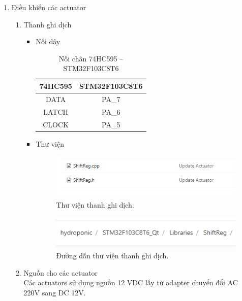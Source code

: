 \documentclass[a4paper,12pt,oneside]{article}
\begin{document}
\begin{enumerate}
\begin{itemize}
	\end{itemize}
	
	\item Điều khiển các actuator
		\begin{enumerate}
			\item Thanh ghi dịch
			\begin{itemize}
			\item Nối dây
				\begin{table}[!htp]
    			\centering
				\begin{tabular}{|c|c|}
				\hline 
				74HC595 & STM32F103C8T6 \\ 
				\hline 
				DATA & PA\_7 \\ 
				\hline 
				LATCH & PA\_6 \\ 
				\hline 
				CLOCK & PA\_5 \\ 
				\hline 
				\end{tabular} 
    			\caption{Nối chân 74HC595 – STM32F103C8T6}
				\end{table}
			\item Thư viện
			\begin{figure}[H]
			\centering
			\begin{center}
			\includegraphics[scale=.7]{hinh/lib_register.PNG}
			\end{center}
			\caption{Thư viện thanh ghi dịch.}
			\end{figure}
			
			\begin{figure}[H]
			\centering
			\begin{center}
			\includegraphics[scale=.7]{hinh/path_register.PNG}
			\end{center}
			\caption{Đường dẫn thư viện thanh ghi dịch.}
			\end{figure}
			\end{itemize}
			
		\item Nguồn cho các actuator \\
		\noindent Các actuators sử dụng nguồn 12 VDC lấy từ adapter chuyển đổi AC 220V sang DC 12V.
		

\end{enumerate}
\end{enumerate}
\end{document}
